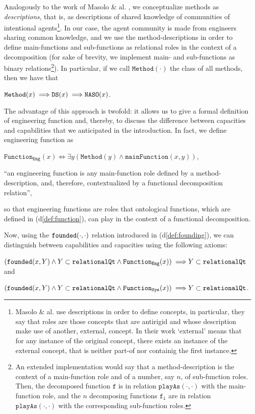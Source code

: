 \documentclass[sw]{iosart2x}
\newcommand{\bflist}{\begin{list}{}{\setlength{\topsep}{2mm}\setlength{\partopsep}{0mm}\setlength{\parsep}{0mm}\setlength{\leftmargin}{9mm}\setlength{\labelwidth}{8mm}}}
\newcommand{\eflist}{\end{list}}
\newcommand{\AxLabel}{\textrm{a}}
\newcommand{\DefLabel}{\textrm{d}}
\newcounter{cntax}
\newcommand{\myax}[1]{\refstepcounter{cntax}\begin{small}{\bf \AxLabel\thecntax\label{ax:#1}}\end{small}}
\newcounter{cntdef}
\newcommand{\mydf}[1]{\refstepcounter{cntdef}\begin{small}{\bf \DefLabel\thecntdef\label{def:#1}}\end{small}}
\newcommand{\refdf}[1]{({\DefLabel}\ref{#1})}
\newcommand{\generalStyle}[1]{\texttt{#1}}
\newcommand{\biRel}[3]{\generalStyle{#1}(#2,#3)}
\newcommand{\uniRel}[2]{\generalStyle{#1}(#2)}
\newcommand{\uniRelPar}[3]{\generalStyle{#1}_{\generalStyle{#3}}(#2)}
\newcommand{\cst}[1]{\ensuremath{\mathtt{#1}}}
\newcommand{\myiff}{\Longleftrightarrow}
\newcommand{\myfi}{\hspace{0.9mm} \Longrightarrow}
\newcommand{\DOLCEDescription}[1]{\uniRel{{DS}}{#1}}
\newcommand{\DOLCENASO}[1]{\uniRel{{NASO}}{#1}}
\newcommand{\RelationalQualityClass}{\generalStyle{relationalQt}}
\newcommand{\CapabilityClass}{\generalStyle{relationalQt}}
\newcommand{\CapacityClass}{\generalStyle{relationalQt}}
\newcommand{\Method}[1]{\uniRel{Method}{#1}}
\newcommand{\FunctionSys}[1]{\uniRelPar{Function}{#1}{Sys}}
\newcommand{\FunctionEng}[1]{\uniRelPar{Function}{#1}{Eng}}
\newcommand{\founded}[2]{\biRel{\foundedTerm{passive}}{#1}{#2}}
\newcommand{\mainFunction}[2]{\biRel{mainFunction}{#1}{#2}}
\newcommand{\playAs}[2]{\biRel{playAs}{#1}{#2}}
\newcommand{\firstTimeKeyWord}[1]{\textit{#1}}
\newcommand{\foundedTerm}[1]{%
  \ifthenelse{\equal{#1}{passive}}{founded}{%
    \ifthenelse{\equal{#1}{verb}}{found}{%
      \ifthenelse{\equal{#1}{gerund}}{founding}{%
        ERROR!%
      }%
    }%
  }%
}
\newcommand{\quotes}[1]{`#1'}
\newcommand{\myComment}[1]{}
\begin{document}
{Analogously to the work of Masolo \& al. \cite{masoloSocialRolesTheir2004}, we conceptualize methods as \firstTimeKeyWord{descriptions}, that is, as descriptions of shared knowledge of communities of intentional agents\footnote{Masolo \& al. use descriptions in order to define concepts, in particular, they say that roles are those concepts that are antirigid and whose description make use of another, external, concept.
In their work \quotes{external} means that for any instance of the original concept, there exists an instance of the external concept, that is neither part-of nor containig the first instance.}. 
In our case, the agent community is made from engineers sharing common knowledge, %
and we use the method-descriptions in order to define main-functions and sub-functions as relational roles in the context of a decomposition (for sake of brevity, we implement main- and sub-functions as binary relations\footnote{An extended implementation would say that a method-description is the context of a main-function role and of a number, say $n$, of sub-function roles. Then, the decomposed function $\cst{f}$ is in relation $\playAs{\cdot}{\cdot}$ with the main-function role, and the $n$ decomposing functions $\cst{f_i}$ are in relation $\playAs{\cdot}{\cdot}$ with the corresponding sub-function roles.}).
In particular, if we call $\Method{\cdot}$ the class \myComment{subsuming all method-types} of all methods, then we have that
\bflist
  \item[\myax{methodSubs}] $ \Method{x} \myfi \DOLCEDescription{x} \myfi \DOLCENASO{x}$.
\eflist

The advantage of this approach is twofold: it allows us to give a formal definition of engineering function and, thereby, to discuss the difference between capacities and capabilities that we anticipated in the introduction. 
In fact, we define engineering function as
\bflist
  \item[\mydf{engfunction}]  $ \FunctionEng{x} \myiff \exists y (\Method{y} \land \mainFunction{x}{y}) $, 
  \item[]  ``an engineering function is any main-function role defined by a method-description, and, therefore, contextualized by a functional decomposition relation'', 
\eflist
so that engineering functions are roles that ontological functions, which are defined in \refdf{def:function}, can play in the context of a functional decomposition.

Now, using the $\founded{\cdot}{\cdot}$ relation introduced in \refdf{def:founding}, we can distinguish between capabilities and capacities using the following axioms:
\bflist
  \item[\myax{capacityCostr}] $ (\founded{x}{Y} \land Y \subset \RelationalQualityClass \land \FunctionEng{x}) \myfi Y \subset \CapacityClass$ and
  \item[\myax{capabilityCostr}] $ (\founded{x}{Y} \land Y \subset \RelationalQualityClass \land \FunctionSys{x}) \myfi Y \subset \CapabilityClass$.
\eflist

}
\end{document}
